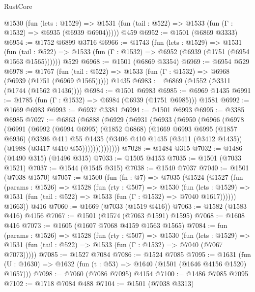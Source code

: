 \begin{lexlean}{RustCore}
\begin{coremodule}
    @1530
      (fun (lets : @1529) =>
      @1531 (fun (tail : @522) => @1533 (fun (Γ : @1532) => @6935 (@6939 @6904)))))
    @459
@6952 := @1501 (@6869 @3333)
@6954 := @1752 @6899 @3716
@6966 := @1743
    (fun (lets : @1529) =>
    @1531
      (fun (tail : @522) => @1533 (fun (Γ : @1532) => @6952 (@6939 (@1751 (@6954 @1563 @1565))))))
    @529
@6968 := @1501 (@6869 @3354)
@6969 := @6954 @529
@6978 := @1767
    (fun (tail : @522) => @1533 (fun (Γ : @1532) => @6968 (@6939 (@1751 (@6969 @1565)))))
    @1435
@6983 := @6869 (@1552 (@3311 (@1744 (@1562 @1436))))
@6984 := @1501 @6983
@6985 := @6969 @1435
@6991 := @1785 (fun (Γ : @1532) => @6984 (@6939 (@1751 @6985))) @1581
@6992 := @1669 @6983
@6993 := @6937 @3381
@6994 := @1501 @6993
@6995 := @3385 @6985
@7027 := @6863
    (@6888
      (@6929
        (@6931
          (@6933
            (@6950
              (@6966
                (@6978
                  (@6991
                    (@6992
                      (@6994 @6995)
                      (@1852 @6868)
                      (@1669
                        @6993
                        @6995
                        (@1857 @6936)
                        (@3396
                          @411
                          @55
                          @1435
                          (@3406
                            @410
                            @1435
                            (@3411 (@3412 @1435))
                            (@1988 (@3417 @410 @55))))))))))))))
@7028 := @1484 @315
@7032 := @1486 (@1490 @315) (@1496 @315)
@7033 := @1505 @4153
@7035 := @1501 (@7033 @1521)
@7037 := @1544 (@1545 @315)
@7038 := @1540 @7037
@7040 := @1501 (@7038 @1570)
@7057 := @1500
    (fun (fn : @7) =>
    @7035
      (@1524
        (@1527
          (fun (params : @1526) =>
          @1528
            (fun (rty : @507) =>
            @1530
              (fun (lets : @1529) =>
              @1531 (fun (tail : @522) => @1533 (fun (Γ : @1532) => @7040 @1617))))))
        @1663))
    @416
@7060 := @1669 (@7033 (@1519 @416))
@7063 := @1582 (@1583 @416) @4156
@7067 := @1501 (@1574 (@7063 @1591) @1595)
@7068 := @1608 @416
@7073 := @1605 (@1607 @7068 @4159 @1563 @1565)
@7084 := fun (params : @1526) =>
  @1528
    (fun (rty : @507) =>
    @1530
      (fun (lets : @1529) =>
      @1531 (fun (tail : @522) => @1533 (fun (Γ : @1532) => @7040 (@7067 @7073)))))
@7085 := @1527 @7084
@7086 := @1524 @7085
@7095 := @1631 (fun (U : @1630) => @1632 (fun (t : @53) => @1640 (@1501 (@1646 @4156 @1520) @1657)))
@7098 := @7060 (@7086 @7095) @4154
@7100 := @1486 @7085 @7095
@7102 := @1718 @7084 @488
@7104 := @1501 (@7038 @3313)

\end{coremodule}
\end{lexlean}
